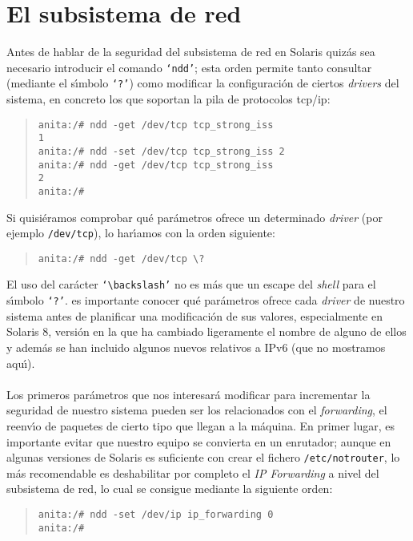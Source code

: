 \section{El subsistema de red}
Antes de hablar de la seguridad del subsistema de red en Solaris quiz\'as sea
necesario introducir el comando {\tt `ndd'}; esta orden permite tanto consultar
(mediante el s\'{\i}mbolo {\tt `?'}) como modificar la configuraci\'on de 
ciertos {\it drivers} del sistema, en concreto los que soportan la pila de 
protocolos {\sc tcp/ip}:
\begin{quote}
\begin{verbatim}
anita:/# ndd -get /dev/tcp tcp_strong_iss 
1
anita:/# ndd -set /dev/tcp tcp_strong_iss 2
anita:/# ndd -get /dev/tcp tcp_strong_iss 
2
anita:/#
\end{verbatim}
\end{quote}
Si quisi\'eramos comprobar qu\'e par\'ametros ofrece un determinado {\it 
driver} (por ejemplo {\tt /dev/tcp}), lo har\'{\i}amos con la orden siguiente:
\begin{quote}
\begin{verbatim}
anita:/# ndd -get /dev/tcp \?
\end{verbatim}
\end{quote}
El uso del car\'acter {\tt `$\backslash$'} no es m\'as que un escape del {\it
shell} para el s\'{\i}mbolo {\tt `?'}. es importante conocer qu\'e par\'ametros
ofrece cada {\it driver} de nuestro sistema antes de planificar una 
modificaci\'on de sus valores, especialmente en Solaris 8, versi\'on en la que
ha cambiado ligeramente el nombre de alguno de ellos y adem\'as se han incluido
algunos nuevos relativos a IPv6 (que no mostramos aqu\'{\i}).\\
\\Los primeros par\'ametros que nos interesar\'a modificar para incrementar
la seguridad de nuestro sistema pueden ser los relacionados con el {\it 
forwarding}, el reenv\'{\i}o de paquetes de cierto tipo que llegan a la 
m\'aquina. En primer lugar, es importante evitar que nuestro equipo se convierta
en un enrutador; aunque en algunas versiones de Solaris es suficiente con 
crear el fichero {\tt /etc/notrouter}, lo m\'as recomendable es deshabilitar por
completo el {\it IP Forwarding} a nivel del subsistema de red, lo cual se 
consigue mediante la siguiente orden:
\begin{quote}
\begin{verbatim}
anita:/# ndd -set /dev/ip ip_forwarding 0
anita:/# 
\end{verbatim}
\end{quote}
